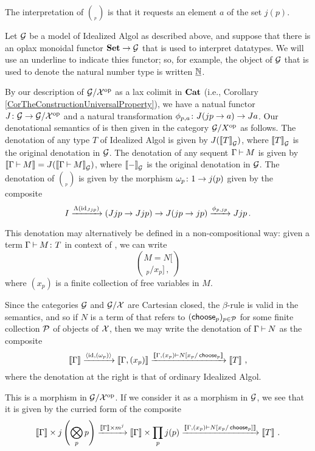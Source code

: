 \documentclass{report}[11pt]
\begin{document}
The interpretation of $\choose_p$ is that it requests an element $a$ of the set $j(p)$.

Let $\G$ be a model of Idealized Algol as described above, and suppose that there is an oplax monoidal functor $\Set \to \G$ that is used to interpret datatypes.  
We will use an underline to indicate thies functor; so, for example, the object of $\G$ that is used to denote the natural number type is written $\ul\bN$.

By our description of $\G/\oppcat \X$ as a lax colimit in $\Cat$ (i.e., Corollary \ref{CorTheConstructionUniversalProperty}), we have a natual functor $J\from \G\to\G/\oppcat \X$ and a natural transformation $\phi_{p,a}\from J(jp\to a) \to Ja$.  
Our denotational semantics of \IAXX is then given in the category $\G/\oppcat X$ as follows.  
The denotation of any type $T$ of Idealized Algol is given by $J(\deno{T}_\G)$, where $\deno{T}_\G$ is the original denotation in $\G$.
The denotation of any sequent $\Gamma\ts M$ is given by $\deno{\Gamma\ts M} = J(\deno{\Gamma\ts M}_\G)$, where $\deno{-}_\G$ is the original denotation in $\G$.
The denotation of $\choose_p$ is given by the morphism $\omega_p \from 1 \to j(p)$ given by the composite
\[
  I \xrightarrow{\Lambda(\id_{Jjp})} (Jjp \to Jjp)  \to J(jp \to jp) \xrightarrow{\phi_{p,jp}} Jjp\,.
  \]

This denotation may alternatively be defined in a non-compositional way: given a term $\Gamma\ts M\from T$ in context of \IAXX, we can write
\[
  M = N[\choose_p/x_p]\,,
  \]
where $(x_p)$ is a finite collection of free variables in $M$.

Since the categories $\G$ and $\G/\X$ are Cartesian closed, the $\beta$-rule is valid in the semantics, and so if $N$ is a term of \IAXX that refers to $(\choose_p)_{p\in\P}$ for some finite collection $\P$ of objects of $\X$, then we may write the denotation of $\Gamma \ts N$ as the composite
\[
  \deno{\Gamma} \xrightarrow{\langle \id,(\omega_p)\rangle} \deno{\Gamma,(x_p)} \xrightarrow{\deno{\Gamma,(x_p)\ts N[x_p/\choose_p}} \deno{T}\,,
  \]
where the denotation at the right is that of ordinary Idealized Algol.

This is a morphism in $\G/\oppcat\X$.  
If we consider it as a morphism in $\G$, we see that it is given by the curried form of the composite
\[
  \deno{\Gamma}\times j\left(\Tensor_p p\right) \xrightarrow{\deno{\Gamma}\times m^j} \deno \Gamma \times \prod_p j(p) \xrightarrow{\deno{\Gamma,(x_p)\ts N[x_p/\choose_p]}} \deno T\,.
  \]
\end{document}
